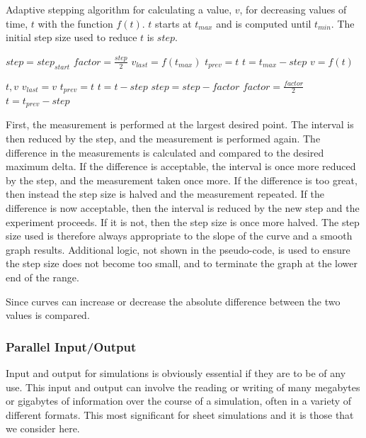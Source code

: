 \begin{algorithm}
\caption{
Adaptive stepping algorithm for calculating a value, $v$, for decreasing values
of time, $t$ with the function $f\!\left(t\right)$.
$t$ starts at $t_{max}$ and is computed until $t_{min}$.
The initial step size used to reduce $t$ is $step$.
}
\label{toolkit:adaptive}
\begin{algorithmic}
\STATE $step = step_{start}$
\STATE $factor = \frac{step}{2}$
\STATE $v_{last} = f\!\left(t_{max}\right)$
\STATE $t_{prev} = t$
\STATE $t = t_{max} - step$
    \STATE $v = f\!\left(t\right)$

        \PRINT $t, v$
        \STATE $v_{last} = v$
        \STATE $t_{prev} = t$
        \STATE $t = t - step$
    \ELSE
        \STATE $step = step - factor$
        \STATE $factor = \frac{factor}{2}$
        \STATE $t = t_{prev} - step$
    \ENDIF
\ENDWHILE
\end{algorithmic}
\end{algorithm}

First, the measurement is performed at the largest desired point.  The interval
is then reduced by the step, and the measurement is performed again.  The
difference in the measurements is calculated and compared to the desired maximum
delta.  If the difference is acceptable, the interval is once more reduced by
the step, and the measurement taken once more.  If the difference is too great,
then instead the step size is halved and the measurement repeated.  If the
difference is now acceptable, then the interval is reduced by the new step and
the experiment proceeds.  If it is not, then the step size is once more halved.
The step size used is therefore always appropriate to the slope of the curve and
a smooth graph results.  Additional logic, not shown in the pseudo-code, is used
to ensure the step size does not become too small, and to terminate the graph at
the lower end of the range.

Since curves can increase or decrease the absolute difference between the two
values is compared.

\subsubsection{Parallel Input/Output}

Input and output for simulations is obviously essential if they are to be of any
use.  This input and output can involve the reading or writing of many megabytes
or gigabytes of information over the course of a simulation, often in a variety
of different formats.  This most significant for sheet simulations and it is
those that we consider here.

